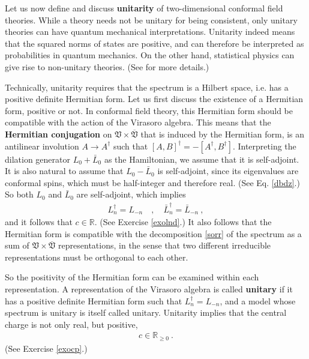 \documentclass[12pt, a4paper, notitlepage, twoside]{report}
\numberwithin{equation}{section}
\theoremstyle{break}
\begin{document}
Let us now define and discuss \textbf{\boldmath unitarity} of two-dimensional conformal field theories. While a theory needs not be unitary for being consistent, only unitary theories can have quantum mechanical interpretations. Unitarity indeed means that the squared norms of states are positive, and can therefore be interpreted as probabilities in quantum mechanics. On the other hand, statistical physics can give rise to non-unitary theories. (See \cite{prv18} for more details.) 

Technically, unitarity requires that 
the spectrum is a Hilbert space, i.e. has a positive definite Hermitian form. Let us first discuss the existence of a Hermitian form, positive or not. 
In conformal field theory, this Hermitian form should be compatible with the action of the Virasoro algebra.
This means that the \textbf{Hermitian conjugation} on $\mathfrak{V}\times\overline{\mathfrak{V}}$ that is induced by the Hermitian form, is an antilinear involution $A\to A^\dagger$ such that $[A,B]^\dagger = -[A^\dagger, B^\dagger]$.
Interpreting the dilation generator $L_0+\bar L_0$ as the Hamiltonian, we assume that it is self-adjoint. It is also natural to assume that $L_0-\bar L_0$ is self-adjoint, since its eigenvalues are conformal spins, which must be half-integer and therefore real. (See Eq. \eqref{dbdz}.) So both $L_0$ and $\bar L_0$ are self-adjoint,
which implies
\begin{align}
 L^\dagger_n = L_{-n} \quad , \quad \bar L_n^\dagger = \bar L_{-n}\ ,
\label{ldn}
\end{align}
and it follows that $c\in \mathbb{R}$. (See Exercise \ref{exolnd}.) 
It also follows that the Hermitian form is compatible with the decomposition \eqref{sorr} of the spectrum as a sum of $\mathfrak{V}\times \overline{\mathfrak{V}}$ representations, in the sense that two different irreducible representations must be orthogonal to each other.

So the positivity of the Hermitian form can be examined within each representation.
A representation of the Virasoro algebra is called \textbf{\boldmath unitary} if it has a positive definite Hermitian form such that 
$L^\dagger_n = L_{-n}$, and a model whose spectrum is unitary is itself called unitary. Unitarity implies that the central charge is not only real, but positive, 
\begin{align}
 c \in \mathbb{R}_{\geq 0}\ .
 \label{cpos}
\end{align}
(See Exercise \ref{exocp}.)
\end{document}
